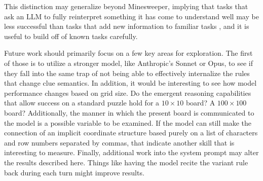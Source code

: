 \documentclass[11pt,conference,compsoc]{IEEEtran}
\begin{document}
This distinction may generalize beyond Minesweeper, implying that tasks that ask an LLM to fully reinterpret something it has come to understand well may be less successful than tasks that add new information to familiar tasks \cite{xu2024puzzlesurvey}, and it is useful to build off of known tasks carefully.

Future work should primarily focus on a few key areas for exploration. The first of those is to utilize a stronger model, like Anthropic's Sonnet or Opus, to see if they fall into the same trap of not being able to effectively internalize the rules that change clue semantics. In addition, it would be interesting to see how model performance changes based on grid size. Do the emergent reasoning capabilities that allow success on a standard puzzle hold for a $10\times10$ board? A $100\times100$ board? Additionally, the manner in which the present board is communicated to the model is a possible variable to be examined. If the model can still make the connection of an implicit coordinate structure based purely on a list of characters and row numbers separated by commas, that indicate another skill that is interesting to measure. Finally, additional work into the system prompt may alter the results described here. Things like having the model recite the variant rule back during each turn might improve results.





%
%


\pagebreak



\end{document}
